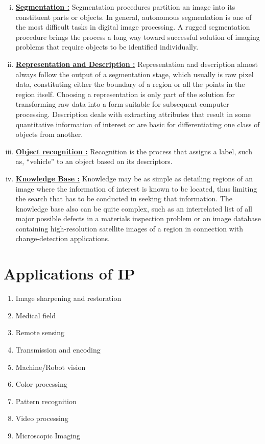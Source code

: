 \documentclass{article}
\begin{document}
\begin{multicols}{2}
\begin{enumerate}[(i)]
            \item \textbf{\underline{Segmentation :}} Segmentation procedures partition an image into its constituent parts or objects. In general, autonomous segmentation is one of the most difficult tasks in digital image processing. A rugged segmentation procedure brings the process a long way toward successful solution of imaging problems that require objects to be identified individually.
            \item \textbf{\underline{Representation and Description :}} Representation and description almost always follow the output of a segmentation stage, which usually is raw pixel data, constituting either the boundary of a region or all the points in the region itself. Choosing a representation is only part of the solution for transforming raw data into a form suitable for subsequent computer processing. Description deals with extracting attributes that result in some quantitative information of interest or are basic for differentiating one class of objects from another.
            \item \textbf{\underline{Object recognition :}} Recognition is the process that assigns a label, such as,  “vehicle” to an object based on its descriptors.
            \item \textbf{\underline{Knowledge Base :}} Knowledge may be as simple as detailing regions of an image where the information of interest is known to be located, thus limiting the search that has to be conducted in seeking that information. The knowledge base also can be quite complex, such as an interrelated list of all major possible defects in a materials inspection problem or an image database containing high-resolution satellite images of a region in connection with change-detection applications.
        \end{enumerate}
        
        \section{Applications of IP}
            \begin{enumerate}[i]
                \item Image sharpening and restoration
                \item Medical field
                \item Remote sensing
                \item Transmission and encoding
                \item Machine/Robot vision
                \item Color processing
                \item Pattern recognition
                \item Video processing
                \item Microscopic Imaging
            \end{enumerate}

\end{multicols}
\end{document}
